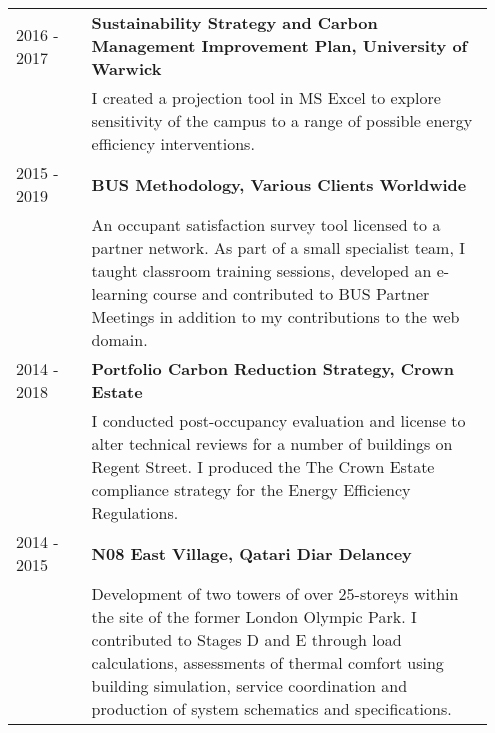 \documentclass[11pt, oneside]{article}   	%
\begin{document}
\begin{table}[h]
\begin{center}
\begin{tabular}{p{0.15\linewidth} p{0.8\linewidth}}
2016 - 2017&\textbf{Sustainability Strategy and Carbon Management Improvement Plan, University of Warwick} \\
&I created a projection tool in MS Excel to explore sensitivity of the campus to a range of possible energy efficiency interventions. \\
2015 - 2019&\textbf{BUS Methodology, Various Clients Worldwide} \\
&An occupant satisfaction survey tool licensed to a partner network. As part of a small specialist team, I taught classroom training sessions, developed an e-learning course and contributed to BUS Partner Meetings in addition to my contributions to the web domain. \\
2014 - 2018&\textbf{Portfolio Carbon Reduction Strategy, Crown Estate} \\
&I conducted post-occupancy evaluation and license to alter technical reviews for a number of buildings on Regent Street. I produced the The Crown Estate compliance strategy for the Energy Efficiency Regulations. \\
2014 - 2015&\textbf{N08 East Village, Qatari Diar Delancey} \\
&Development of two towers of over 25-storeys within the site of the former London Olympic Park. I contributed to Stages D and E through load calculations, assessments of thermal comfort using building simulation, service coordination and production of system schematics and specifications. \\
\hline
\end{tabular}
\end{center}
\vspace{-10mm}
\end{table}

\pagebreak
\end{document}
